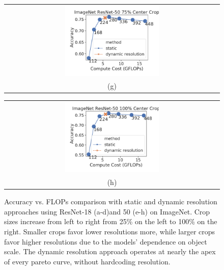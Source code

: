 \begin{figure}[h!]
\begin{tabular}{@{}c@{}}
    \includegraphics[width=0.45\textwidth]{e2e_figures/imagenet_resnet50_default_center.pdf} \\
    \small (g)
    \end{tabular}
    \begin{tabular}{@{}c@{}}
    \includegraphics[width=0.45\textwidth]{e2e_figures/imagenet_resnet50_full_center.pdf} \\
    \small (h)
    \end{tabular}
    \caption{Accuracy vs. FLOPs comparison with static and dynamic resolution approaches using ResNet-18 (a-d)and 50 (e-h) on ImageNet. Crop sizes increase from left to right from 25\% on the left to 100\% on the right. Smaller crops favor lower resolutions more, while larger crops favor higher resolutions due to the models' dependence on object scale. The dynamic resolution approach operates at nearly the apex of every pareto curve, without hardcoding resolution.}
    \label{fig:accflops_resnet_imagenet}
\end{figure}
